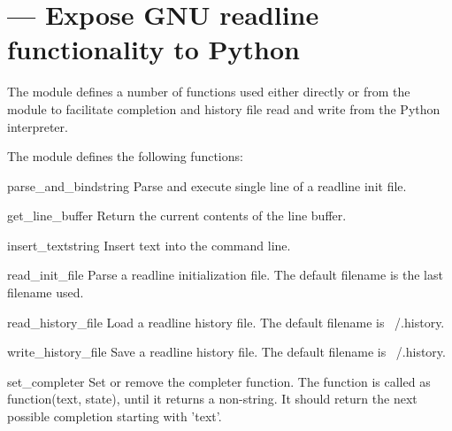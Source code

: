\section{ ---
         Expose GNU readline functionality to Python}




The  module defines a number of functions used either
directly or from the  module to facilitate completion
and history file read and write from the Python interpreter.

The  module defines the following functions:

\begin{funcdesc}{parse_and_bind}{string}
Parse and execute single line of a readline init file.
\end{funcdesc}

\begin{funcdesc}{get_line_buffer}{}
Return the current contents of the line buffer.
\end{funcdesc}

\begin{funcdesc}{insert_text}{string}
Insert text into the command line.
\end{funcdesc}

\begin{funcdesc}{read_init_file}{}
Parse a readline initialization file.
The default filename is the last filename used.
\end{funcdesc}

\begin{funcdesc}{read_history_file}{}
Load a readline history file.
The default filename is ~/.history.
\end{funcdesc}

\begin{funcdesc}{write_history_file}{}
Save a readline history file.
The default filename is ~/.history.
\end{funcdesc}

\begin{funcdesc}{set_completer}{}
Set or remove the completer function.
The function is called as function(text, state),
 until it returns a non-string.
It should return the next possible completion starting with 'text'.
\end{funcdesc}

